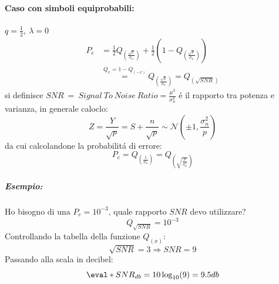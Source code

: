             \paragraph{Caso con simboli equiprobabili:} $q=\frac{1}{2},\ \lambda = 0$
                \begin{align}
                    P_e &= \frac{1}{2}Q_{\left(\frac{\sqrt{p}}{\sigma_n}\right)}+ \frac{1}{2}\left(1-Q_{\left(\frac{\sqrt{p}}{\sigma_n}\right)}\right)\nonumber \\
                        &\overset{Q_{x} = 1-Q_{(-x)}}{=} Q_{\left(\frac{\sqrt{p}}{\sigma_n}\right)} = Q_{(\sqrt{SNR})}\nonumber  
                \end{align}
                si definisce $SNR\ =\ Signal\ To\ Noise\ Ratio =\frac{\mu^2}{\sigma_n^2}$ é il rapporto tra potenza e varianza, in generale caloclo:
                \[
                    Z = \frac{Y}{\sqrt{p}} = S+\frac{n}{\sqrt{p}} \sim \mathcal{N}(\pm 1,\frac{\sigma_n^2}{p})   
                \] 
                da cui calcolandone la probabilitá di errore:
                \[
                    P_e = Q_{\left(\frac{1}{\sigma_n}\right)} = Q_{\left(\sqrt{\frac{p}{\sigma_n^2}}\right)}
                \]
                \subparagraph*{Esempio:} Ho bisogno di una $P_e = 10^{-3}$, quale rapporto $SNR$ devo utilizzare?
                \[
                    Q_{\sqrt{SNR}} = 10^{-3}   
                \]
                Controllando la tabella della funzione $Q_{(x)}$:
                \[
                    \sqrt{SNR} = 3 \Rightarrow SNR=9    
                \]
                Passando alla scala in decibel:
                \[
                    \eval*{SNR}_{db} = 10 \log_{10}(9) = 9.5db    
                \]

